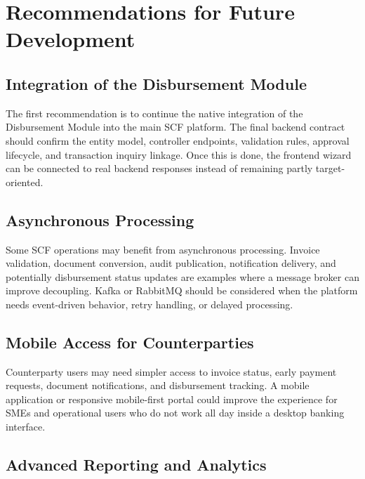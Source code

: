 \section{Recommendations for Future Development}
\label{sec:ch6_recommendations}

\subsection{Integration of the Disbursement Module}
\label{subsec:ch6_disbursement_integration}

The first recommendation is to continue the native integration of the Disbursement Module into the main SCF platform. The final backend contract should confirm the entity model, controller endpoints, validation rules, approval lifecycle, and transaction inquiry linkage. Once this is done, the frontend wizard can be connected to real backend responses instead of remaining partly target-oriented.

\subsection{Asynchronous Processing}
\label{subsec:ch6_async_processing}

Some SCF operations may benefit from asynchronous processing. Invoice validation, document conversion, audit publication, notification delivery, and potentially disbursement status updates are examples where a message broker can improve decoupling. Kafka or RabbitMQ should be considered when the platform needs event-driven behavior, retry handling, or delayed processing.

\subsection{Mobile Access for Counterparties}
\label{subsec:ch6_mobile_access}

Counterparty users may need simpler access to invoice status, early payment requests, document notifications, and disbursement tracking. A mobile application or responsive mobile-first portal could improve the experience for SMEs and operational users who do not work all day inside a desktop banking interface.

\subsection{Advanced Reporting and Analytics}
\label{subsec:ch6_reporting_analytics}

